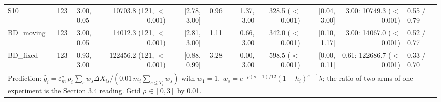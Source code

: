 \begin{tabular}{llp{4.2cm}rrrrrrrp{4.6cm}}
S10 & 123 & 3.00, 0.05 & 10703.8 (121, $<$0.001) & [2.78, 3.00] & 0.96 & 1.37, 3.00 & 328.5 ($<$0.001) & [0.04, 3.00] & 3.00: 10749.3 ($<$0.001) & 0.55 / 0.79 \\
BD_moving & 123 & 3.00, 0.05 & 14012.3 (121, $<$0.001) & [2.81, 3.00] & 1.11 & 0.66, 3.00 & 342.0 ($<$0.001) & [0.10, 1.17] & 3.00: 14067.0 ($<$0.001) & 0.52 / 0.77 \\
BD_fixed & 123 & 0.93, 3.00 & 122456.2 (121, $<$0.001) & [0.88, 0.99] & 3.28 & 0.00, 3.00 & 598.5 ($<$0.001) & [0.00, 0.11] & 0.61: 122686.7 ($<$0.001) & 0.33 / 0.70 \\
\multicolumn{11}{l}{\footnotesize Prediction: $\hat g_i = \varepsilon_m^{c} \, p_i \sum_s w_s \Delta X_{is} / (0.01\, m_i \sum_{s \le T_i} w_s)$ with $w_1 = 1$, $w_s = e^{-\rho (s-1)/12} (1-h_i)^{s-1} \lambda$; the ratio of two arms of one experiment is the Section 3.4 reading. Grid $\rho \in [0, 3]$ by 0.01.} \\
\bottomrule
\end{tabular}
